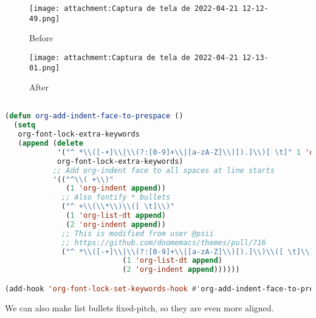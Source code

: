 \documentclass[11pt]{article}
\begin{document}
\begin{enumerate}
\begin{enumerate}
\begin{row}
\begin{figure}
  \texttt{[image: attachment:Captura de tela de 2022-04-21 12-12-49.png]}
  \caption{Before}
\end{figure}


\begin{figure}
  
  \texttt{[image: attachment:Captura de tela de 2022-04-21 12-13-01.png]}
  \caption{After}
\end{figure}\end{row}

\begin{lstlisting}[language=Lisp]%! Someone please complete this list for me

(defun org-add-indent-face-to-prespace ()
  (setq
   org-font-lock-extra-keywords
   (append (delete
            '("^ *\\([-+]\\|\\(?:[0-9]+\\|[a-zA-Z]\\)[).]\\)[ \t]" 1 'org-list-dt append)
            org-font-lock-extra-keywords)
           ;; Add org-indent face to all spaces at line starts
           '(("^\\( +\\)"
              (1 'org-indent append))
             ;; Also fontify * bullets
             ("^ +\\(\\*\\)\\([ \t]\\)"
              (1 'org-list-dt append)
              (2 'org-indent append))
             ;; This is modified from user @psii
             ;; https://github.com/doomemacs/themes/pull/716
             ("^ *\\([-+]\\|\\(?:[0-9]+\\|[a-zA-Z]\\)[).]\\)\\([ \t]\\)"
                           (1 'org-list-dt append)
                           (2 'org-indent append))))))

(add-hook 'org-font-lock-set-keywords-hook #'org-add-indent-face-to-prespace)
\end{lstlisting}

We can also make list bullets fixed-pitch, so they are even more aligned.


\end{enumerate}
\end{enumerate}
\end{document}
